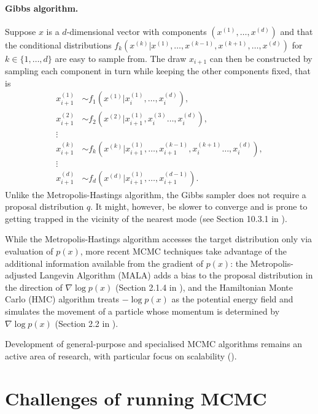\documentclass[11pt,a4paper]{report}
\begin{document}
\paragraph{Gibbs algorithm.} Suppose $x$ is a $d$-dimensional vector with components $(x^{(1)}, \dots, x^{(d)})$ and that the conditional distributions $f_k(x^{(k)} | x^{(1)}, \dots, x^{(k-1)}, x^{(k+1)}, \dots, x^{(d)})$ for $k \in \{1, \dots, d\}$ are easy to sample from. The draw $x_{i+1}$ can then be constructed by sampling each component in turn while keeping the other components fixed, that is
\begin{equation*}
\begin{aligned}
x_{i+1}^{(1)} &\sim f_1(x^{(1)} | x_{i}^{(1)}, \dots, x_{i}^{(d)}), \\
x_{i+1}^{(2)} &\sim f_2(x^{(2)} | x_{i+1}^{(1)}, x_{i}^{(3)} \dots, x_{i}^{(d)}), \\
\vdots \\
x_{i+1}^{(k)} &\sim f_k(x^{(k)} | x_{i+1}^{(1)}, \dots, x_{i+1}^{(k-1)}, x_{i}^{(k+1)} \dots, x_{i}^{(d)}), \\
\vdots \\
x_{i+1}^{(d)} &\sim f_d(x^{(d)} | x_{i+1}^{(1)}, \dots, x_{i+1}^{(d-1)}).
\end{aligned}
\end{equation*}
Unlike the Metropolis-Hastings algorithm, the Gibbs sampler does not require a proposal distribution $q$. It might, however, be slower to converge and is prone to getting trapped in the vicinity of the nearest mode (see Section 10.3.1 in \cite{robertMonteCarloStatistical2004}).

While the Metropolis-Hastings algorithm accesses the target distribution only via evaluation of $p(x)$, more recent MCMC techniques take advantage of the additional information available from the gradient of $p(x)$: the Metropolis-adjusted Langevin Algorithm (MALA) adds a bias to the proposal distribution in the direction of $\nabla \log p(x)$ (Section 2.1.4 in \cite{fearnheadScalableMonteCarlo2024}), and the Hamiltonian Monte Carlo (HMC) algorithm treats $-\log p(x)$ as the potential energy field and simulates the movement of a particle whose momentum is determined by $\nabla \log p(x)$ (Section 2.2 in \cite{fearnheadScalableMonteCarlo2024}).

Development of general-purpose and specialised MCMC algorithms remains an active area of research, with particular focus on scalability (\cite{fearnheadScalableMonteCarlo2024}).

\section{Challenges of running MCMC}
\label{sec:background:challenges}
\end{document}
